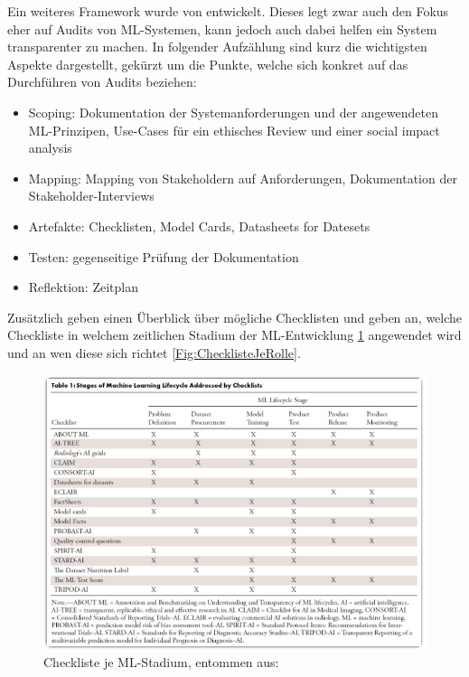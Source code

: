 Ein weiteres Framework wurde von \cite{garbin2022assessing} entwickelt. Dieses legt zwar auch den Fokus eher auf Audits von ML-Systemen, kann jedoch auch dabei helfen ein System transparenter zu machen. In folgender Aufzählung sind kurz die wichtigsten Aspekte dargestellt, gekürzt um die Punkte, welche sich konkret auf das Durchführen von Audits beziehen:
\begin{itemize}
    \item Scoping: Dokumentation der Systemanforderungen und der angewendeten ML-Prinzipen, Use-Cases für ein ethisches Review und einer social impact analysis
    \item Mapping: Mapping von Stakeholdern auf Anforderungen, Dokumentation der Stakeholder-Interviews
    \item Artefakte: Checklisten, Model Cards, Datasheets for Datesets
    \item Testen: gegenseitige Prüfung der Dokumentation
    \item Reflektion: Zeitplan
\end{itemize}
Zusätzlich geben \cite{garbin2022assessing} einen Überblick über mögliche Checklisten und geben an, welche Checkliste in welchem zeitlichen Stadium der ML-Entwicklung \ref{Fig:ChecklisteJeStadium} angewendet wird und an wen diese sich richtet \ref{Fig:ChecklisteJeRolle}.
\begin{figure}[h]
    \centering
    \includegraphics[scale=0.45]{pic/MA-Bilder/Literaturrecherche/49-ChecklistNachStages.PNG}
    \caption{Checkliste je ML-Stadium, entommen aus: \cite{garbin2022assessing}}
    \label{Fig:ChecklisteJeStadium}
\end{figure}
